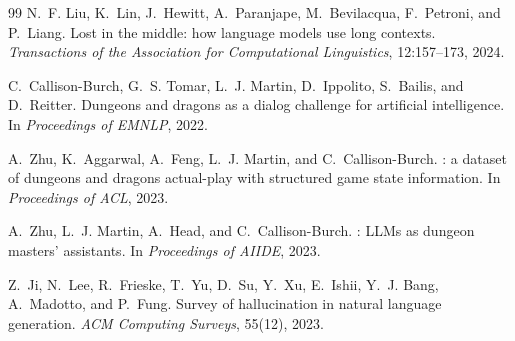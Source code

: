 \documentclass[11pt]{article}
\begin{document}
\begin{thebibliography}{99}
N.~F. Liu, K.~Lin, J.~Hewitt, A.~Paranjape, M.~Bevilacqua, F.~Petroni, and P.~Liang.
\newblock Lost in the middle: how language models use long contexts.
\newblock \emph{Transactions of the Association for Computational Linguistics}, 12:157--173, 2024.

C.~Callison-Burch, G.~S. Tomar, L.~J. Martin, D.~Ippolito, S.~Bailis, and D.~Reitter.
\newblock Dungeons and dragons as a dialog challenge for artificial intelligence.
\newblock In \emph{Proceedings of EMNLP}, 2022.

A.~Zhu, K.~Aggarwal, A.~Feng, L.~J. Martin, and C.~Callison-Burch.
: a dataset of dungeons and dragons actual-play with structured game state
  information.
\newblock In \emph{Proceedings of ACL}, 2023.

A.~Zhu, L.~J. Martin, A.~Head, and C.~Callison-Burch.
: {LLMs} as dungeon masters' assistants.
\newblock In \emph{Proceedings of AIIDE}, 2023.

Z.~Ji, N.~Lee, R.~Frieske, T.~Yu, D.~Su, Y.~Xu, E.~Ishii, Y.~J. Bang, A.~Madotto, and P.~Fung.
\newblock Survey of hallucination in natural language generation.
\newblock \emph{ACM Computing Surveys}, 55(12), 2023.

\end{thebibliography}
\end{document}

